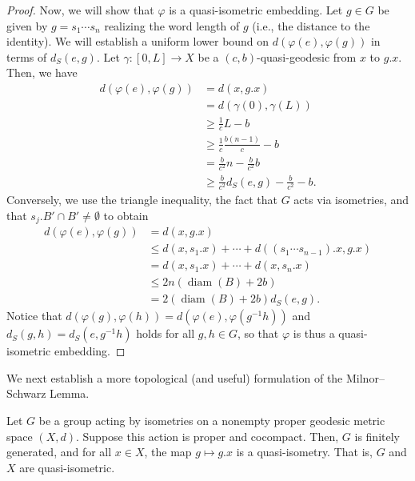 \documentclass[10pt]{mypackage}
\begin{document}
\begin{proof}
  Now, we will show that $\varphi$ is a quasi-isometric embedding. Let $g\in G$ be given by $g = s_1\cdots s_n$ realizing the word length of $g$ (i.e., the distance to the identity). We will establish a uniform lower bound on $d\left( \varphi(e),\varphi(g) \right)$ in terms of $d_S\left( e,g \right)$. Let $\gamma\colon [0,L]\to X$ be a $\left( c,b \right)$-quasi-geodesic from $x$ to $g.x$. Then, we have
  \begin{align*}
    d\left( \varphi(e),\varphi(g) \right) &= d\left( x,g.x \right)\\
                                          &= d\left( \gamma(0),\gamma(L) \right)\\
                                          &\geq \frac{1}{c}L-b\\
                                          &\geq \frac{1}{c}\frac{b\left( n-1 \right)}{c} - b\\
                                          &= \frac{b}{c^2}n - \frac{b}{c^2}b\\
                                          &\geq \frac{b}{c^2}d_S\left( e,g \right) - \frac{b}{c^2}-b.
  \end{align*}
  Conversely, we use the triangle inequality, the fact that $G$ acts via isometries, and that $s_j.B'\cap B' \neq \emptyset$ to obtain
  \begin{align*}
    d\left( \varphi(e),\varphi(g) \right) &= d\left( x,g.x \right)\\
                                          &\leq d\left( x,s_1.x \right) + \cdots + d\left( \left( s_1\cdots s_{n-1} \right).x, g.x \right)\\
                                          &= d\left( x,s_1.x \right) + \cdots + d\left( x,s_n.x \right)\\
                                          &\leq 2n\left( \operatorname{diam}\left( B \right) + 2b \right)\\
                                          &= 2\left( \operatorname{diam}\left( B \right) + 2b \right)d_S\left( e,g \right).
  \end{align*}
  Notice that $d\left( \varphi(g),\varphi(h) \right) = d\left( \varphi(e),\varphi\left( g^{-1}h \right) \right)$ and $d_S\left( g,h \right) = d_S\left( e,g^{-1}h \right)$ holds for all $g,h\in G$, so that $\varphi$ is thus a quasi-isometric embedding.
\end{proof}
We next establish a more topological (and useful) formulation of the Milnor--Schwarz Lemma.
\begin{corollary}
  Let $G$ be a group acting by isometries on a nonempty proper geodesic metric space $\left( X,d \right)$. Suppose this action is proper and cocompact. Then, $G$ is finitely generated, and for all $x\in X$, the map $g\mapsto g.x$ is a quasi-isometry. That is, $G$ and $X$ are quasi-isometric.
\end{corollary}
\end{document}
